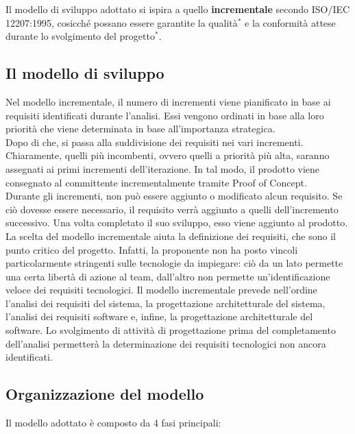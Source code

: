 Il modello di sviluppo adottato si ispira a quello \textbf{incrementale} secondo ISO/IEC 12207:1995, cosicché possano essere garantite la qualità$^*$ e la conformità attese durante lo svolgimento del progetto$^*$.

\subsection{Il modello di sviluppo}
Nel modello incrementale, il numero di incrementi viene pianificato in base ai requisiti identificati durante l'analisi. Essi vengono ordinati in base alla loro priorità che viene determinata in base all'importanza strategica.\\
Dopo di che, si passa alla suddivisione dei requisiti nei vari incrementi. Chiaramente, quelli più incombenti, ovvero quelli a priorità più alta, saranno assegnati ai primi incrementi dell'iterazione. In tal modo, il prodotto viene consegnato al committente incrementalmente tramite Proof of Concept.\\
Durante gli incrementi, non può essere aggiunto o modificato alcun requisito. Se ciò dovesse essere necessario, il requisito verrà aggiunto a quelli dell'incremento successivo. Una volta completato il suo sviluppo, esso viene aggiunto al prodotto.\\
La scelta del modello incrementale aiuta la definizione dei requisiti, che sono il punto critico del progetto. Infatti, la proponente non ha posto vincoli particolarmente stringenti sulle tecnologie da impiegare: ciò da un lato permette una certa libertà di azione al team, dall'altro non permette un'identificazione veloce dei requisiti tecnologici. Il modello incrementale prevede nell'ordine l'analisi dei requisiti del sistema, la progettazione architetturale del sistema, l'analisi dei requisiti software e, infine, la progettazione architetturale del software. Lo svolgimento di attività di progettazione prima del completamento dell'analisi permetterà la determinazione dei requisiti tecnologici non ancora identificati.

\subsection{Organizzazione del modello}
Il modello adottato è composto da 4 fasi principali:

